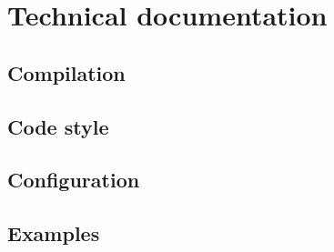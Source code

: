 \documentclass[12pt]{article}
\begin{document}
\section{Technical documentation}

\subsection{Compilation}

\subsection{Code style}

\subsection{Configuration}

\subsection{Examples}

\begin{thebibliography}{9}


\end{thebibliography}
\end{document}
